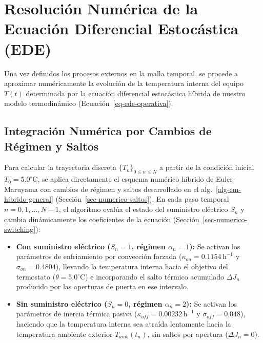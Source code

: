 \documentclass[
  spanish,
  letterpaper,
  DIV=11,
  numbers=noendperiod]{scrreprt}
\providecommand{\tightlist}{%
  \setlength{\itemsep}{0pt}\setlength{\parskip}{0pt}}
\theoremstyle{plain}
\theoremstyle{plain}
\theoremstyle{plain}
\theoremstyle{definition}
\theoremstyle{remark}
\begin{document}
\section{Resolución Numérica de la Ecuación Diferencial Estocástica
(EDE)}\label{resoluciuxf3n-numuxe9rica-de-la-ecuaciuxf3n-diferencial-estocuxe1stica-ede}

Una vez definidos los procesos externos en la malla temporal, se procede
a aproximar numéricamente la evolución de la temperatura interna del
equipo \(T(t)\) determinada por la ecuación diferencial estocástica
híbrida de nuestro modelo termodinámico
(Ecuación~\ref{eq-ede-operativa}).

\subsection{Integración Numérica por Cambios de Régimen y
Saltos}\label{integraciuxf3n-numuxe9rica-por-cambios-de-ruxe9gimen-y-saltos}

Para calcular la trayectoria discreta \(\{T_n\}_{0 \le n \le N}\) a
partir de la condición inicial \(T_0 = 5.0^\circ\text{C}\), se aplica
directamente el esquema numérico híbrido de Euler-Maruyama con cambios
de régimen y saltos desarrollado en el alg.~\ref{alg-em-hibrido-general}
(Sección~\ref{sec-numerico-saltos}). En cada paso temporal
\(n = 0, 1, \dots, N - 1\), el algoritmo evalúa el estado del suministro
eléctrico \(S_n\) y cambia dinámicamente los coeficientes de la ecuación
(Sección~\ref{sec-numerico-switching}):

\begin{itemize}
\tightlist
\item
  \textbf{Con suministro eléctrico (\(S_n = 1\), régimen
  \(\alpha_n = 1\)):} Se activan los parámetros de enfriamiento por
  convección forzada (\(\kappa_{on} = 0.1154\,\text{h}^{-1}\) y
  \(\sigma_{on} = 0.4804\)), llevando la temperatura interna hacia el
  objetivo del termostato (\(\theta = 5.0^\circ\text{C}\)) e
  incorporando el salto térmico acumulado \(\Delta J_n\) producido por
  las aperturas de puerta en ese intervalo.
\item
  \textbf{Sin suministro eléctrico (\(S_n = 0\), régimen
  \(\alpha_n = 2\)):} Se activan los parámetros de inercia térmica
  pasiva (\(\kappa_{off} = 0.00232\,\text{h}^{-1}\) y
  \(\sigma_{off} = 0.048\)), haciendo que la temperatura interna sea
  atraída lentamente hacia la temperatura ambiente exterior
  \(T_{amb}(t_n)\), sin saltos por apertura (\(\Delta J_n = 0\)).
\end{itemize}
\end{document}
